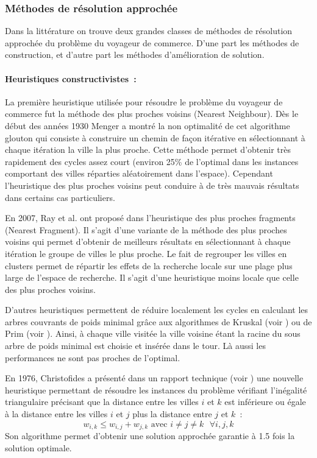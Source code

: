 \subsubsection{Méthodes de résolution approchée}

Dans la littérature on trouve deux grandes classes de méthodes de résolution approchée du problème du voyageur de commerce. D'une part les méthodes de construction, et d'autre part les méthodes d'amélioration de solution.

\paragraph{Heuristiques constructivistes~:}
\label{sec:tsp:resolution:approchee:constructivistes}
La première heuristique utilisée pour résoudre le problème du voyageur de commerce fut la méthode des plus proches voisins (Nearest Neighbour). Dès le début des années 1930 Menger a montré la non optimalité de cet algorithme glouton qui consiste à construire un chemin de façon itérative en sélectionnant à chaque itération la ville la plus proche. Cette méthode permet d'obtenir très rapidement des cycles assez court (environ 25\% de l'optimal dans les instances comportant des villes réparties aléatoirement dans l'espace). Cependant l'heuristique des plus proches voisins peut conduire à de très mauvais résultats dans certains cas particuliers.

En 2007, Ray et al. ont proposé dans \cite{Ray2007} l'heuristique des plus proches fragments (Nearest Fragment). Il s'agit d'une variante de la méthode des plus proches voisins qui permet d'obtenir de meilleurs résultats en sélectionnant à chaque itération le groupe de villes le plus proche. Le fait de regrouper les villes en clusters permet de répartir les effets de la recherche locale sur une plage plus large de l'espace de recherche. Il s'agit d'une heuristique moins locale que celle des plus proches voisins.

D'autres heuristiques permettent de réduire localement les cycles en calculant les arbres couvrants de poids minimal grâce aux algorithmes de Kruskal (voir \cite{Kruskal1956}) ou de Prim (voir \cite{Prim1957}). Ainsi, à chaque ville visitée la ville voisine étant la racine du sous arbre de poids minimal est choisie et insérée dans le tour. Là aussi les performances ne sont pas proches de l'optimal.

En 1976, Christofides a présenté dans un rapport technique (voir \cite{Christofides1976}) une nouvelle heuristique permettant de résoudre les instances du problème vérifiant l'inégalité triangulaire précisant que la distance entre les villes $i$ et $k$ est inférieure ou égale à la distance entre les villes $i$ et $j$ plus la distance entre $j$ et $k$~:
\begin{equation}
   w_{i,k} \leq w_{i,j} + w_{j,k} \text{ avec $i\neq j\neq k$} \text{ $\forall i, j, k$}    
\end{equation}
Son algorithme permet d'obtenir une solution approchée garantie à 1.5 fois la solution optimale.

